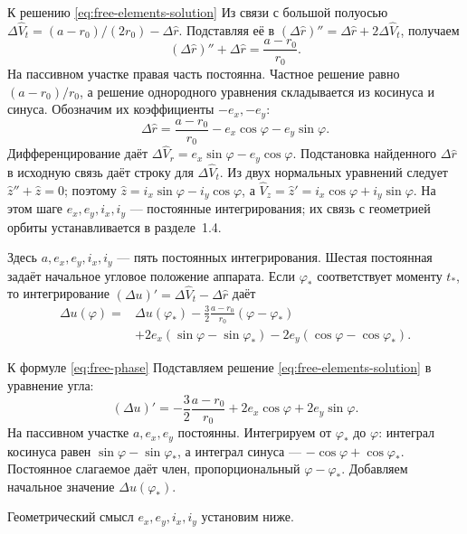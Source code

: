 \documentclass[a4paper,11pt]{article}
\numberwithin{equation}{section}
\theoremstyle{remark}
\begin{document}
\begin{explanation}{К решению \eqref{eq:free-elements-solution}}
Из связи с большой полуосью
$\Delta\widehat V_t=(a-r_0)/(2r_0)-\Delta\widehat r$.
Подставляя её в $(\Delta\widehat r)''=\Delta\widehat r+2\Delta\widehat V_t$,
получаем
\[
(\Delta\widehat r)''+\Delta\widehat r=\frac{a-r_0}{r_0}.
\]
На пассивном участке правая часть постоянна. Частное решение
равно $(a-r_0)/r_0$, а решение однородного уравнения складывается
из косинуса и синуса. Обозначим их коэффициенты $-e_x,-e_y$:
\[
\Delta\widehat r=\frac{a-r_0}{r_0}-e_x\cos\varphi-e_y\sin\varphi.
\]
Дифференцирование даёт
$\Delta\widehat V_r=e_x\sin\varphi-e_y\cos\varphi$.
Подстановка найденного $\Delta\widehat r$ в исходную связь
даёт строку для $\Delta\widehat V_t$.
Из двух нормальных уравнений следует
$\widehat z''+\widehat z=0$; поэтому
$\widehat z=i_x\sin\varphi-i_y\cos\varphi$, а
$\widehat V_z=\widehat z'=i_x\cos\varphi+i_y\sin\varphi$.
На этом шаге $e_x,e_y,i_x,i_y$ --- постоянные интегрирования;
их связь с геометрией орбиты устанавливается в разделе~1.4.
\end{explanation}

Здесь $a,e_x,e_y,i_x,i_y$ --- пять постоянных интегрирования.
Шестая постоянная задаёт начальное угловое положение аппарата. Если $\varphi_*$ соответствует
моменту $t_*$, то интегрирование
$(\Delta u)'=\Delta\widehat V_t-\Delta\widehat r$ даёт
\begin{equation}
 \begin{aligned}
 \Delta u(\varphi)={}&\Delta u(\varphi_*)-
 \frac{3}{2}\frac{a-r_0}{r_0}(\varphi-\varphi_*)\\
 &+2e_x(\sin\varphi-\sin\varphi_*)
 -2e_y(\cos\varphi-\cos\varphi_*).
 \end{aligned}
 \label{eq:free-phase}
\end{equation}
\begin{explanation}{К формуле \eqref{eq:free-phase}}
Подставляем решение \eqref{eq:free-elements-solution} в уравнение угла:
\[
(\Delta u)'=-\frac32\frac{a-r_0}{r_0}
                 +2e_x\cos\varphi+2e_y\sin\varphi.
\]
На пассивном участке $a,e_x,e_y$ постоянны.
Интегрируем от $\varphi_*$ до $\varphi$:
интеграл косинуса равен $\sin\varphi-\sin\varphi_*$,
а интеграл синуса --- $-\cos\varphi+\cos\varphi_*$.
Постоянное слагаемое даёт член, пропорциональный
$\varphi-\varphi_*$. Добавляем начальное значение
$\Delta u(\varphi_*)$.
\end{explanation}

Геометрический смысл $e_x,e_y,i_x,i_y$ установим ниже.
\end{document}
